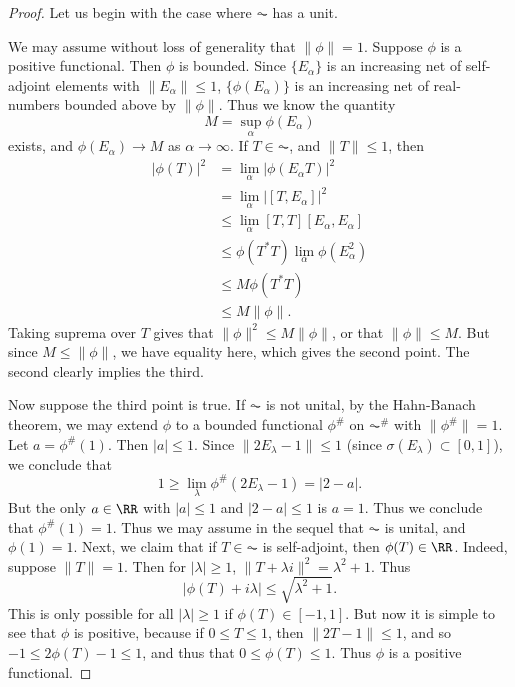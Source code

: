 \begin{proof}
    Let us begin with the case where $\AC$ has a unit. 

    We may assume without loss of generality that $\| \phi \| = 1$. Suppose $\phi$ is a positive functional. Then $\phi$ is bounded. Since $\{ E_\alpha \}$ is an increasing net of self-adjoint elements with $\| E_\alpha \| \leq 1$, $\{ \phi(E_\alpha) \}$ is an increasing net of real-numbers bounded above by $\| \phi \|$. Thus we know the quantity
    \[ M = \sup_\alpha \phi(E_\alpha) \]
    exists, and $\phi(E_\alpha) \to M$ as $\alpha \to \infty$. If $T \in \AC$, and $\| T \| \leq 1$, then
    \begin{align*}
        |\phi(T)|^2 &= \lim_\alpha |\phi(E_\alpha T)|^2\\
        &= \lim_\alpha |[T,E_\alpha]|^2\\
        &\leq \lim_\alpha [T,T] [E_\alpha,E_\alpha]\\
        &\leq \phi(T^*T) \lim_\alpha \phi(E_\alpha^2)\\
        &\leq M \phi(T^*T)\\
        &\leq M \| \phi \|.
    \end{align*}
    Taking suprema over $T$ gives that $\| \phi \|^2 \leq M \| \phi \|$, or that $\| \phi \| \leq M$. But since $M \leq \| \phi \|$, we have equality here, which gives the second point. The second clearly implies the third.

    Now suppose the third point is true. If $\AC$ is not unital, by the Hahn-Banach theorem, we may extend $\phi$ to a bounded functional $\phi^\#$ on $\AC^\#$ with $\| \phi^\# \| = 1$. Let $a = \phi^\#(1)$. Then $|a| \leq 1$. Since $\| 2 E_\lambda - 1 \| \leq 1$ (since $\sigma(E_\lambda) \subset [0,1]$), we conclude that
    \[ 1 \geq \lim_\lambda \phi^\#(2 E_\lambda - 1) = |2 - a|. \]
    But the only $a \in \RR$ with $|a| \leq 1$ and $|2 - a| \leq 1$ is $a = 1$. Thus we conclude that $\phi^\#(1) = 1$. Thus we may assume in the sequel that $\AC$ is unital, and $\phi(1) = 1$. Next, we claim that if $T \in \AC$ is self-adjoint, then $\phi(T) \in \RR$. Indeed, suppose $\| T \| = 1$. Then for $|\lambda| \geq 1$, $\| T + \lambda i \|^2 = \lambda^2 + 1$. Thus
    \[ |\phi(T) + i \lambda| \leq \sqrt{\lambda^2 + 1}. \]
    This is only possible for all $|\lambda| \geq 1$ if $\phi(T) \in [-1,1]$. But now it is simple to see that $\phi$ is positive, because if $0 \leq T \leq 1$, then $\| 2T - 1 \| \leq 1$, and so $-1 \leq 2\phi(T) - 1 \leq 1$, and thus that $0 \leq \phi(T) \leq 1$. Thus $\phi$ is a positive functional.
\end{proof}







